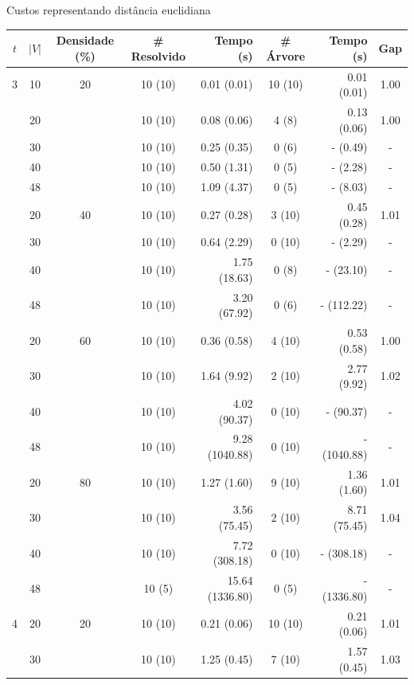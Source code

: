\documentclass[dvipsnames]{beamer}
\newcommand\Fontvi{\fontsize{5}{6.2}\selectfont}
\begin{document}
\begin{frame}{Custos representando distância euclidiana}
  \tiny{
    \Fontvi
\begin{table}
\begin{tabular}{|c|c|c|c|r|c|r|c|}\hline

{$t$} & {$|V|$} & {Densidade (\%)} & {\# Resolvido } & {Tempo (s)}  &{\# Árvore}  &{Tempo (s)} & {Gap}
\\ \hline\hline
3 & 10 & 20 & 10 (10) & 0.01 (0.01) & 10 (10) & 0.01 (0.01) & 1.00 \\
 & 20 & & 10 (10) & 0.08 (0.06) & 4 (8) & 0.13 (0.06) & 1.00 \\
 & 30 & & 10 (10) & 0.25 (0.35) & 0 (6) & - (0.49) & - \\
 & 40 & & 10 (10) & 0.50 (1.31) & 0 (5) & - (2.28) & - \\
 & 48 & & 10 (10) & 1.09 (4.37) & 0 (5) & - (8.03) & - \\
 & 20 & 40 & 10 (10) & 0.27 (0.28) & 3 (10) & 0.45 (0.28) & 1.01 \\
 & 30 & & 10 (10) & 0.64 (2.29) & 0 (10) & - (2.29) & - \\
 & 40 & & 10 (10) & 1.75 (18.63) & 0 (8) & - (23.10) & - \\
 & 48 & & 10 (10) & 3.20 (67.92) & 0 (6) & - (112.22) & - \\
 & 20 & 60 & 10 (10) & 0.36 (0.58) & 4 (10) & 0.53 (0.58) & 1.00 \\
 & 30 & & 10 (10) & 1.64 (9.92) & 2 (10) & 2.77 (9.92) & 1.02 \\
 & 40 & & 10 (10) & 4.02 (90.37) & 0 (10) & - (90.37) & - \\
 & 48 & & 10 (10) & 9.28 (1040.88) & 0 (10) & - (1040.88) & - \\
 & 20 & 80 & 10 (10) & 1.27 (1.60) & 9 (10) & 1.36 (1.60) & 1.01 \\
 & 30 & & 10 (10) & 3.56 (75.45) & 2 (10) & 8.71 (75.45) & 1.04 \\
 & 40 & & 10 (10) & 7.72 (308.18) & 0 (10) & - (308.18) & - \\
 & 48 & & 10 (5) & 15.64 (1336.80) & 0 (5) & - (1336.80) & - \\
4 & 20 & 20 & 10 (10) & 0.21 (0.06) & 10 (10) & 0.21 (0.06) & 1.01 \\
 & 30 & & 10 (10) & 1.25 (0.45) & 7 (10) & 1.57 (0.45) & 1.03 \\

\end{tabular}
\end{table}}
\end{frame}
\end{document}
